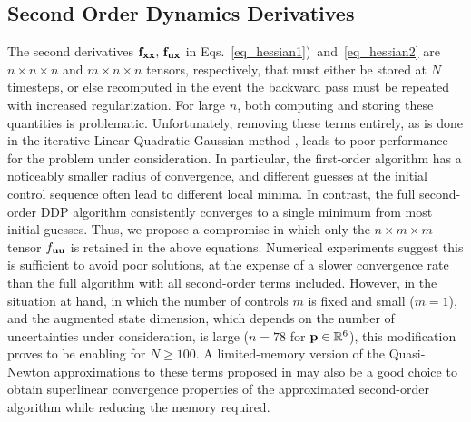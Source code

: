 
\subsection{Second Order Dynamics Derivatives}\label{Sec:DDP_Simplification}
The second derivatives $\mathbf{f}_{\mathbf{x}\mathbf{x}},\, \mathbf{f}_{\mathbf{u}\mathbf{x}}$ in Eqs.~\eqref{eq_hessian1})~and~\eqref{eq_hessian2} are $n\times n\times n$ and $m\times n\times n$ tensors, respectively, that must either be stored at $N$ timesteps, or else recomputed in the event the backward pass must be repeated with increased regularization. For large $n$, both computing and storing these quantities is problematic. Unfortunately, removing these terms entirely, as is done in the iterative Linear Quadratic Gaussian method \cite{iLQG}, leads to poor performance for the problem under consideration. In particular, the first-order algorithm has a noticeably smaller radius of convergence, and different guesses at the initial control sequence often lead to different local minima. In contrast, the full second-order DDP algorithm consistently converges to a single minimum from most initial guesses. Thus, we propose a compromise in which only the $n\times m \times m$ tensor $f_{\mathbf{u}\mathbf{u}}$ is retained in the above equations. Numerical experiments suggest this is sufficient to avoid poor solutions, at the expense of a slower convergence rate than the full algorithm with all second-order terms included. However, in the situation at hand, in which the number of controls $m$ is fixed and small ($ m=1 $), and the augmented state dimension, which depends on the number of uncertainties under consideration, is large ($n=78$ for $\mathbf{p}\in\mathbb{R}^6$), this modification proves to be enabling for $N\geq 100$. A limited-memory version of the Quasi-Newton approximations to these terms proposed in \cite{QNDDP} may also be a good choice to obtain superlinear convergence properties of the approximated second-order algorithm while reducing the memory required. 

